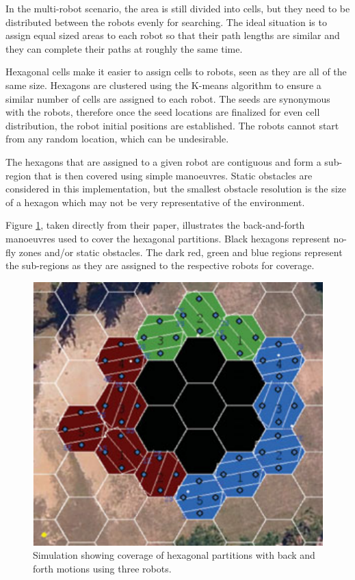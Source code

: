 In the multi-robot scenario, the area is still divided into cells, but they need to be distributed between the robots evenly for searching. The ideal situation is to assign equal sized areas to each robot so that their path lengths are similar and they can complete their paths at roughly the same time.

Hexagonal cells make it easier to assign cells to robots, seen as they are all of the same size. Hexagons are clustered using the K-means algorithm to ensure a similar number of cells are assigned to each robot. The seeds are synonymous with the robots, therefore once the seed locations are finalized for even cell distribution, the robot initial positions are established. The robots cannot start from any random location, which can be undesirable. 

The hexagons that are assigned to a given robot are contiguous and form a sub-region that is then covered using simple manoeuvres. Static obstacles are considered in this implementation, but the smallest obstacle resolution is the size of a hexagon which may not be very representative of the environment. 

Figure \ref{fig:Hex}, taken directly from their paper, illustrates the back-and-forth manoeuvres used to cover the hexagonal partitions. Black hexagons represent no-fly zones and/or static obstacles. The dark red, green and blue regions represent the sub-regions as they are assigned to the respective robots for coverage.
\begin{figure}[h!]
\centering
\includegraphics[scale=0.4]{figs/Hexagonal_Partitioning_Graphic}
\caption{Simulation showing coverage of hexagonal partitions with back and forth motions using three robots. \cite{Azpurua2018}}
\label{fig:Hex}
\end{figure}
